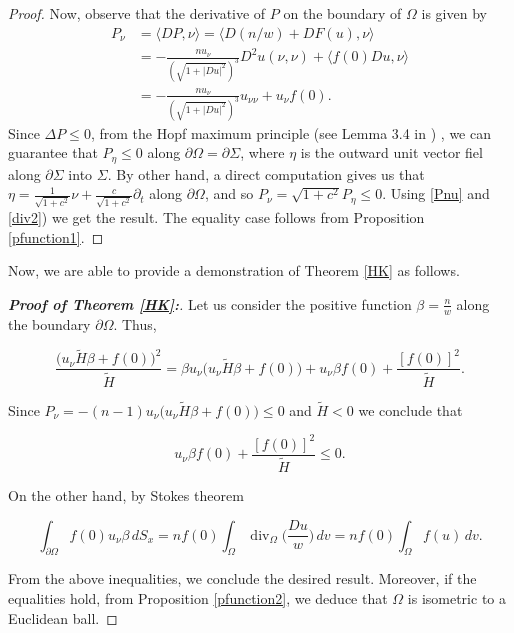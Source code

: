\documentclass[12pt]{amsart}
\theoremstyle{plain}
\numberwithin{equation}{section}
\begin{document}
\begin{proof}
    Now, observe that the derivative of $P$ on the boundary of $\Omega$ is given by
\begin{align}\label{Pnu}
    P_\nu&= \langle DP, \nu\rangle=\langle D(n/w)+D F(u),\nu\rangle\nonumber\\
    &=-\frac{nu_\nu}{(\sqrt{1+|D u|^2})^3}D^2 u(\nu, \nu)+\langle f(0)D u,\nu\rangle\nonumber\\
    &=-\frac{nu_\nu}{(\sqrt{1+|D u|^2})^3}u_{\nu\nu}+u_\nu f(0).
\end{align}
Since $\Delta P\leq 0$, from the Hopf maximum principle (see Lemma 3.4 in \cite{GT98}) , we can guarantee that $P_\eta\leq 0$ along $\partial\Omega=\partial\Sigma$, where $\eta$ is the outward unit vector fiel along $\partial\Sigma$ into $\Sigma$. By other hand, a direct computation gives us that $\eta = \frac{1}{\sqrt{1+c^2}}\nu + \frac{c}{\sqrt{1+c^2}}\partial_t$ along $\partial\Omega$, and so $P_\nu =\sqrt{1+c^2}P_\eta\leq 0$. Using \eqref{Pnu} and \eqref{div2}) we get the result. The equality case follows from Proposition \ref{pfunction1}.
\end{proof}


Now, we are able to provide a demonstration of Theorem \ref{HK} as follows. 

\begin{proof}[\textbf{Proof of Theorem \ref{HK}:}] 
    
Let us consider the positive function $\beta=\displaystyle{\frac{n}{w}}$ along the boundary $\partial\Omega.$ Thus,

$$\frac{\big(u_\nu \widetilde{H}\beta+f(0)\big)^2}{\widetilde{H}}=\beta u_{\nu}\big(u_\nu \widetilde{H}\beta+f(0)\big)+u_\nu\beta f(0)+\frac{[f(0)]^2}{\widetilde{H}}.$$

Since $P_\nu=-(n-1)u_{\nu}\big(u_\nu \widetilde{H}\beta+f(0)\big)\leq 0$ and $\widetilde{H}<0$ we conclude that  

$$u_\nu\beta f(0)+\frac{[f(0)]^2}{\widetilde{H}}\leq 0.$$

On the other hand, by Stokes theorem

$$\int_{\partial\Omega} f(0) u_\nu\beta \,dS_x=nf(0)\int_\Omega \operatorname{div}_\Omega\bigg(\frac{D u}{w}\bigg)\,dv=nf(0)\int_\Omega f(u)\, dv.$$

From the above inequalities, we conclude the desired result. Moreover, if the equalities hold, from Proposition \ref{pfunction2}, we deduce that $\Omega$ is isometric to a Euclidean ball. 

\end{proof}
\end{document}
